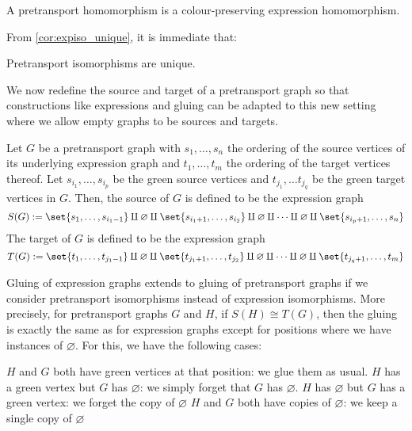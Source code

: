 \documentclass[./Thick_TQFTs_and_Quantum_Information.tex]{subfiles}
\begin{document}
\begin{defn}
A pretransport homomorphism is a colour-preserving expression homomorphism.
\end{defn}


From \ref{cor:expiso_unique}, it is immediate that:

\begin{cor}
Pretransport isomorphisms are unique.
\end{cor}

We now redefine the source and target of a pretransport graph so that
constructions like expressions and gluing can be adapted to this new setting
where we allow empty graphs to be sources and targets.

\begin{defn}
Let $G$ be a pretransport graph with $s_1, \dots, s_n$ the ordering of the
source vertices of its underlying expression graph and $t_1, \dots, t_m$ the
ordering of the target vertices thereof. Let $s_{i_1}, \dots, s_{i_p}$ be the
green source vertices and $t_{j_1}, \dots t_{j_q}$ be the green target vertices
in $G$. Then, the source of $G$ is defined to be the expression graph
\[
  S(G) := \set{s_1, \dots, s_{i_1 - 1}}
       \amalg \varnothing
       \amalg \set{s_{i_1 + 1}, \dots, s_{i_2}}
       \amalg \varnothing
       \amalg \cdots
       \amalg \varnothing
       \amalg \set{s_{i_p + 1}, \dots, s_{n}}
\]
The target of $G$ is defined to be the expression graph
\[
  T(G) := \set{t_{1}, \dots, t_{j_1 - 1}}
       \amalg \varnothing
       \amalg \set{t_{j_1 + 1}, \dots, t_{j_2}}
       \amalg \varnothing
       \amalg \cdots
       \amalg \varnothing
       \amalg \set{t_{j_q + 1}, \dots, t_{m}}
\]
\end{defn}

\begin{defn}
Gluing of expression graphs extends to gluing of pretransport graphs if we
consider pretransport isomorphisms instead of expression isomorphisms. More
precisely, for pretransport graphs $G$ and $H$, if $S(H) \cong T(G)$, then the
gluing is exactly the same as for expression graphs except for positions where
we have instances of $\varnothing$. For this, we have the following cases:
\begin{enmrt}
\li $H$ and $G$ both have green vertices at that position: we glue them
as usual.
\li $H$ has a green vertex but $G$ has $\varnothing$: we simply forget
that $G$ has $\varnothing$.
\li $H$ has $\varnothing$ but $G$ has a green vertex: we forget the copy
of $\varnothing$
\li $H$ and $G$ both have copies of $\varnothing$: we keep a single copy
of $\varnothing$
\end{enmrt}
\end{defn}
\end{document}
